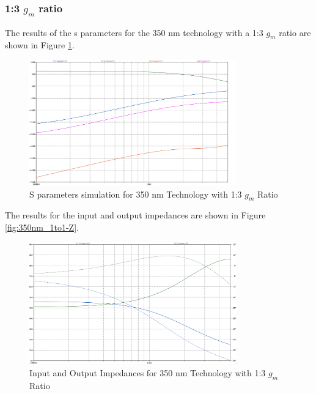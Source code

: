\subsubsection{1:3 $g_m$ ratio}

The results of the s parameters for the 350 nm technology with a 1:3 $g_m$ ratio are shown in Figure \ref{fig:350nm_1ton}. 
\begin{figure}[H]
    \centering
    \includegraphics[width=0.8\textwidth]{Images/3501to3SParam.png}
    \caption{S parameters simulation for 350 nm Technology with 1:3 $g_m$ Ratio}
    \label{fig:350nm_1ton}
\end{figure}

The results for the input and output impedances are shown in Figure \ref{fig:350nm_1to1-Z}.

\begin{figure}[H]
    \centering
    \includegraphics[width=0.8\textwidth]{Images/3501to3ZParam.png}
    \caption{Input and Output Impedances for 350 nm Technology with 1:3 $g_m$ Ratio}
    \label{fig:350nm_1ton-Z}
\end{figure}

